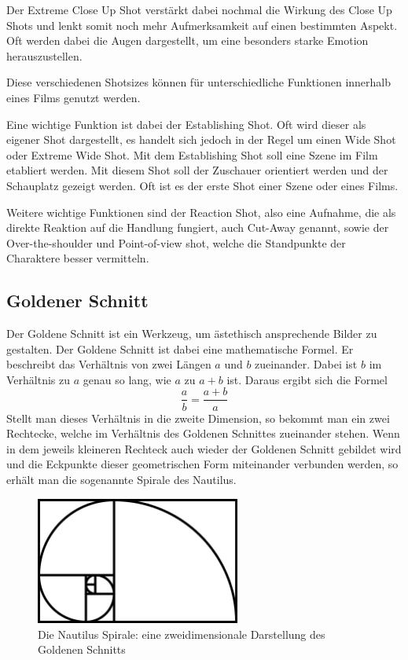 Der Extreme Close Up Shot verstärkt dabei nochmal die Wirkung des Close Up Shots und lenkt somit noch mehr Aufmerksamkeit auf einen bestimmten Aspekt. Oft werden dabei die Augen dargestellt, um eine besonders starke Emotion herauszustellen.

Diese verschiedenen Shotsizes können für unterschiedliche Funktionen innerhalb eines Films genutzt werden.\autocite{Studiobinder.2020}

Eine wichtige Funktion ist dabei der Establishing Shot. Oft wird dieser als eigener Shot dargestellt, es handelt sich jedoch in der Regel um einen Wide Shot oder Extreme Wide Shot. Mit dem Establishing Shot soll eine Szene im Film etabliert werden. Mit diesem Shot soll der Zuschauer orientiert werden und der Schauplatz gezeigt werden. Oft ist es der erste Shot einer Szene oder eines Films.

Weitere wichtige Funktionen sind der Reaction Shot, also eine Aufnahme, die als direkte Reaktion auf die Handlung fungiert, auch Cut-Away genannt, sowie der Over-the-shoulder und Point-of-view shot, welche die Standpunkte der Charaktere besser vermitteln.
\subsection{Goldener Schnitt}
Der Goldene Schnitt ist ein Werkzeug, um ästethisch ansprechende Bilder zu gestalten.\autocite{Bruchwitz.2017}
Der Goldene Schnitt ist dabei eine mathematische Formel. Er beschreibt das Verhältnis von zwei Längen $a$ und $b$ zueinander. Dabei ist $b$ im Verhältnis zu $a$ genau so lang, wie $a$ zu $a + b$ ist. Daraus ergibt sich die Formel
\begin{equation}
    \frac{a}{b} = \frac{a+b}{a}
\end{equation}
Stellt man dieses Verhältnis in die zweite Dimension, so bekommt man ein zwei Rechtecke, welche im Verhältnis des Goldenen Schnittes zueinander stehen. Wenn in dem jeweils kleineren Rechteck auch wieder der Goldenen Schnitt gebildet wird und die Eckpunkte dieser geometrischen Form miteinander verbunden werden, so erhält man die sogenannte Spirale des Nautilus.

\begin{figure}[h]
    \centering
    \includegraphics[width=0.6\textwidth]{img/AO_GoldenerSchnitt.jpg}
    \caption[Imagefilm: Der Goldene Schnitt]{Die Nautilus Spirale: eine zweidimensionale Darstellung des Goldenen Schnitts}
    \label{fig:AO_GoldenerSchnitt}
\end{figure}

